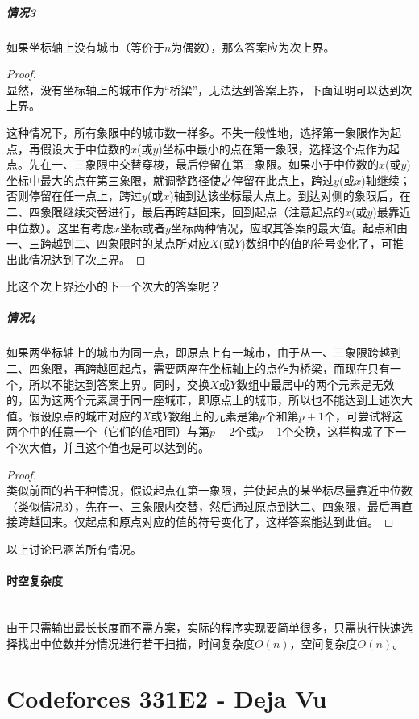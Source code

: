 \documentclass[UTF8]{ctexart}
\newcommand{\myparagraph}[1]{\paragraph{#1}\mbox{}\\}
\theoremstyle{nonumberplain}
\newtheorem{proof}{\hspace{1em}证明：}
\begin{document}
			\subparagraph{情况3}
			如果坐标轴上没有城市（等价于$n$为偶数），那么答案应为次上界。
			
			\begin{proof}\mbox{}\\
			
				显然，没有坐标轴上的城市作为“桥梁”，无法达到答案上界，下面证明可以达到次上界。
				
				这种情况下，所有象限中的城市数一样多。不失一般性地，选择第一象限作为起点，再假设大于中位数的$x$(或$y$)坐标中最小的点在第一象限，选择这个点作为起点。先在一、三象限中交替穿梭，最后停留在第三象限。如果小于中位数的$x$(或$y$)坐标中最大的点在第三象限，就调整路径使之停留在此点上，跨过$y$(或$x$)轴继续；否则停留在任一点上，跨过$y$(或$x$)轴到达该坐标最大点上。到达对侧的象限后，在二、四象限继续交替进行，最后再跨越回来，回到起点（注意起点的$x$(或$y$)最靠近中位数）。这里有考虑$x$坐标或者$y$坐标两种情况，应取其答案的最大值。起点和由一、三跨越到二、四象限时的某点所对应$X$(或$Y$)数组中的值的符号变化了，可推出此情况达到了次上界。
			\end{proof}
			
			比这个次上界还小的下一个次大的答案呢？
			
			\subparagraph{情况4}
			如果两坐标轴上的城市为同一点，即原点上有一城市，由于从一、三象限跨越到二、四象限，再跨越回起点，需要两座在坐标轴上的点作为桥梁，而现在只有一个，所以不能达到答案上界。同时，交换$X$或$Y$数组中最居中的两个元素是无效的，因为这两个元素属于同一座城市，即原点上的城市，所以也不能达到上述次大值。假设原点的城市对应的$X$或$Y$数组上的元素是第$p$个和第$p+1$个，可尝试将这两个中的任意一个（它们的值相同）与第$p+2$个或$p-1$个交换，这样构成了下一个次大值，并且这个值也是可以达到的。
			
			\begin{proof}\mbox{}\\
			
				类似前面的若干种情况，假设起点在第一象限，并使起点的某坐标尽量靠近中位数（类似情况3），先在一、三象限内交替，然后通过原点到达二、四象限，最后再直接跨越回来。仅起点和原点对应的值的符号变化了，这样答案能达到此值。
			\end{proof}
			
			以上讨论已涵盖所有情况。
			
		\myparagraph{时空复杂度}
		
			由于只需输出最长长度而不需方案，实际的程序实现要简单很多，只需执行快速选择找出中位数并分情况进行若干扫描，时间复杂度$O(n)$，空间复杂度$O(n)$。
	
	\section{Codeforces 331E2 - Deja Vu}
		
\end{document}
